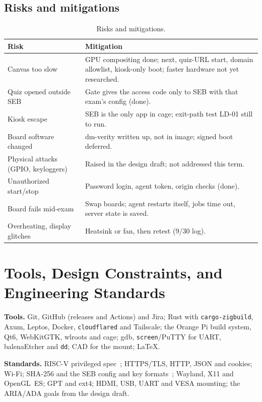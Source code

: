 \documentclass[11pt]{article}
\begin{document}
\subsection{Risks and mitigations}
\begin{table}[H]
\centering
\footnotesize
\begin{tabularx}{\textwidth}{@{}p{}X@{}}
\toprule
\textbf{Risk} & \textbf{Mitigation} \\
\midrule
Canvas too slow & GPU compositing done; next, quiz-URL start, domain allowlist, kiosk-only boot; faster hardware not yet researched. \\
Quiz opened outside SEB & Gate gives the access code only to SEB with that exam's config (done). \\
Kiosk escape & SEB is the only app in cage; exit-path test LD-01 still to run. \\
Board software changed & dm-verity written up, not in image; signed boot deferred. \\
Physical attacks (GPIO, keyloggers) & Raised in the design draft; not addressed this term. \\
Unauthorized start/stop & Password login, agent token, origin checks (done). \\
Board fails mid-exam & Swap boards; agent restarts itself, jobs time out, server state is saved. \\
Overheating, display glitches & Heatsink or fan, then retest (9/30 log). \\
\bottomrule
\end{tabularx}
\caption{Risks and mitigations.}
\end{table}

\section{Tools, Design Constraints, and Engineering Standards}

\textbf{Tools.} Git, GitHub (releases and Actions) and Jira; Rust with \texttt{cargo-zigbuild}, Axum, Leptos, Docker, \texttt{cloudflared} and Tailscale; the Orange Pi build system, Qt6, WebKitGTK, wlroots and cage; gdb, \texttt{screen}/PuTTY for UART, balenaEtcher and \texttt{dd}; CAD for the mount; \LaTeX.

\textbf{Standards.} RISC-V privileged spec~\cite{riscv_priv}; HTTPS/TLS, HTTP, JSON and cookies; Wi-Fi; SHA-256 and the SEB config and key formats~\cite{seb_concept}; Wayland, X11 and OpenGL~ES; GPT and ext4; HDMI, USB, UART and VESA mounting; the ARIA/ADA goals from the design draft.
\end{document}
